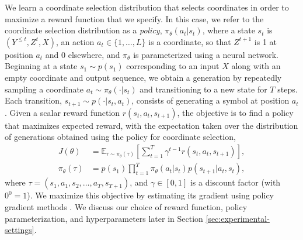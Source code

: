 \documentclass{article}
\begin{document}
We learn a coordinate selection distribution that selects coordinates in order to maximize a reward function that we specify. 
In this case, we refer to the coordinate selection distribution as a 
\textit{policy}, $\pi_{\theta}(a_t|s_t)$, 
where a state $s_t$ is $(Y^{\leq t},Z^t,X)$, 
an action $a_t\in\{1,\ldots,L\}$ is a coordinate, 
so that $Z^{t+1}$ is 1 at position $a_t$ and 0 elsewhere, 
and $\pi_{\theta}$ is parameterized using a neural network. %
Beginning at a state $s_1\sim p(s_1)$ corresponding to an input $X$ 
along with an empty coordinate and output sequence, we obtain a generation by repeatedly sampling a coordinate $a_t\sim \pi_{\theta}(\cdot|s_t)$ and transitioning to a new state for $T$ steps. 
Each transition, $s_{t+1}\sim p(\cdot|s_t,a_t)$, consists of generating a symbol at position $a_t$.
Given a scalar reward function $r(s_t,a_t,s_{t+1})$, the objective is to find a policy that maximizes expected reward, with the expectation taken over the distribution of generations obtained using the policy for coordinate selection,
\begin{align}
\label{eq:rl-objective}
    J(\theta)&= \mathbb{E}_{\tau\sim \pi_{\theta}(\tau)}\left[\sum_{t=1}^{T}\gamma^{t-1}r(s_{t},a_t,s_{t+1})\right],\\
    \pi_{\theta}(\tau) &=p(s_1)\prod_{t=1}^{T}\pi_{\theta}(a_t|s_t)p(s_{t+1}|a_t,s_t),
\end{align}
where $\tau =(s_1, a_1,s_2,\ldots,a_{T},s_{T+1})$, and $\gamma\in [0,1]$ is a discount factor (with $0^0=1$).
We maximize this objective by estimating its gradient using policy gradient methods \cite{williams1992simple}.
We discuss our choice of reward function, policy parameterization, and hyperparameters later in Section \ref{sec:experimental-settings}.


\end{document}
